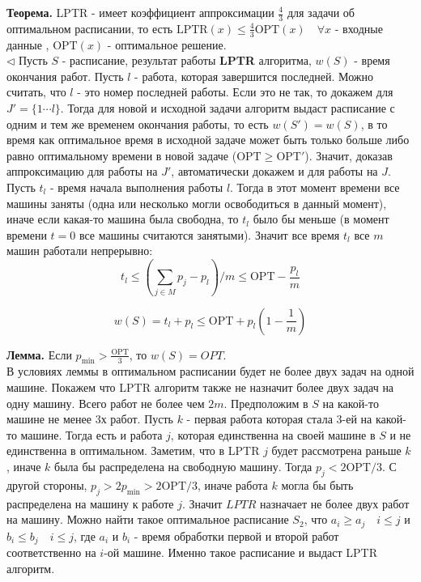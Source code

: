 \documentclass[10pt]{article}
\begin{document}
\indent \textbf{Теорема.} LPTR - имеет коэффициент аппроксимации $\frac{4}{3}$ для задачи об оптимальном расписании, 
то есть $ \text{LPTR} (x) \leq \frac{4}{3} \text{OPT} (x) \quad \forall x$ - входные данные , $\text{OPT} (x)$ - оптимальное решение. \\
\indent $\triangleleft$ 
                Пусть $S$ - расписание, результат работы \textbf{LPTR} алгоритма, $w(S)$ - время окончания работ. Пусть $l$ - работа, которая завершится последней. Можно считать, что $l$ - это номер последней работы. Если это не так,
                то докажем для $J' = \{1 \cdots l\}$. Тогда для новой и исходной задачи алгоритм выдаст расписание с одним и тем же временем окончания работы, то есть $w(S') = w(S)$, в то время как оптимальное время в исходной задаче может быть только больше либо равно оптимальному времени в новой задаче ($\text{OPT} \geq \text{OPT}'$). Значит, доказав аппроксимацию для работы на $J'$, автоматически докажем и для работы на $J$. \\

                Пусть $t_l$ - время начала выполнения работы $l$. Тогда в этот момент времени все машины заняты (одна или несколько могли освободиться в данный момент), иначе если какая-то машина была свободна, то  $t_l$ было бы меньше (в момент времени $t = 0$ все машины считаются занятыми). Значит все время $t_l$ все $m$ машин работали непрерывно: 
                \begin{equation}
                    t_l \leq (\sum_{j \in M} p_j - p_l)/m \leq \text{OPT} - \frac{p_l}{m}
                \end{equation}

                \begin{equation} \label{eq:estimation}
                    w(S) = t_l + p_l \leq \text{OPT} + p_l (1 - \frac{1}{m}) 
                \end{equation}

                \textbf{Лемма.} Если $p_{\min} > \frac{\text{OPT}}{3}$, то $w(S) = OPT$. \\
                 В условиях леммы в оптимальном расписании будет не более двух задач на одной машине. Покажем что LPTR алгоритм также не назначит более двух задач на одну машину. Всего работ не более чем $2m$. Предположим в $S$ на какой-то машине не менее 3х работ. Пусть $k$ - первая работа которая стала 3-ей на какой-то машине. Тогда есть и работа $j$, которая единственна на своей машине в $S$  
                и не единственна в оптимальном. Заметим, что в LPTR $j$ будет рассмотрена раньше $k$ , иначе $k$ была бы распределена на свободную машину. Тогда $p_j < 2 \text{OPT} /3 $. С другой стороны, $p_j > 2 p_{\min} > 2 \text{OPT}/3$, иначе работа $k$ могла бы быть распределена на машину к работе $j$. Значит $LPTR$ назначает не более двух работ на машину. Можно найти такое оптимальное расписание $S_2$, что $a_i \geq a_j \quad i \leq j$ и $b_i \leq b_j \quad i \leq j$, где $a_i$ и $b_i$ - время обработки первой и второй работ соответственно на $i$-ой машине. Именно такое расписание и выдаст LPTR алгоритм.
\end{document}
